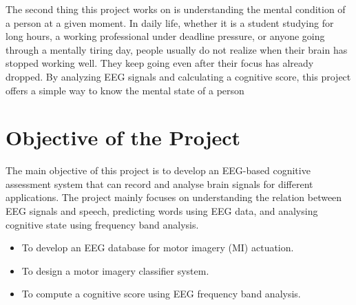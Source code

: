 The second thing this project works on is understanding the mental condition of a person at a given moment. In daily life, whether it is a student studying for long hours, a working professional under deadline pressure, or anyone going through a mentally tiring day, people usually do not realize when their brain has stopped working well. They keep going even after their focus has already dropped. By analyzing EEG signals and calculating a cognitive score, this project offers a simple way to know the mental state of a person



\section{Objective of the Project}

The main objective of this project is to develop an EEG-based cognitive assessment system that can record and analyse brain signals for different applications. The project mainly focuses on understanding the relation between EEG signals and speech, predicting words using EEG data, and analysing cognitive state using frequency band analysis.\\

\begin{itemize}[topsep=2pt, itemsep=4pt]
    \item To develop an EEG database for motor imagery (MI) actuation.

    \item To design a motor imagery classifier system.

    \item To compute a cognitive score using EEG frequency band analysis.
\end{itemize}
